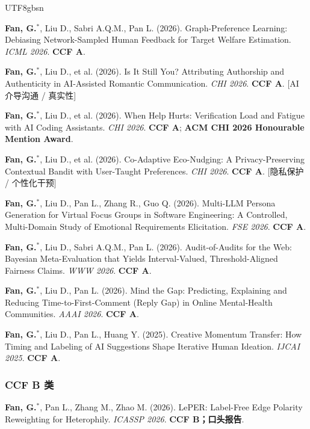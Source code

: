 \documentclass[a4paper,10pt]{article}
\newcommand{\papertag}[1]{\textcolor{cvgray}{\footnotesize\textsf{[#1]}}}
\newcommand{\pubitem}[1]{\item #1}
\begin{document}
\begin{CJK*}{UTF8}{gbsn}
\begin{enumerate}[label=\textbf{[C\arabic*]}]
  \pubitem{\textbf{Fan, G.}$^{*}$, Liu D., Sabri A.Q.M., Pan L. (2026). Graph-Preference Learning: Debiasing Network-Sampled Human Feedback for Target Welfare Estimation. \textit{ICML 2026}. \textbf{CCF A}. }

  \pubitem{\textbf{Fan, G.}$^{*}$, Liu D., et al. (2026). Is It Still You? Attributing Authorship and Authenticity in AI-Assisted Romantic Communication. \textit{CHI 2026}. \textbf{CCF A}. \papertag{AI 介导沟通 / 真实性}}

  \pubitem{\textbf{Fan, G.}$^{*}$, Liu D., et al. (2026). When Help Hurts: Verification Load and Fatigue with AI Coding Assistants. \textit{CHI 2026}. \textbf{CCF A}; \textbf{ACM CHI 2026 Honourable Mention Award}. }

  \pubitem{\textbf{Fan, G.}$^{*}$, Liu D., et al. (2026). Co-Adaptive Eco-Nudging: A Privacy-Preserving Contextual Bandit with User-Taught Preferences. \textit{CHI 2026}. \textbf{CCF A}. \papertag{隐私保护 / 个性化干预}}

  \pubitem{\textbf{Fan, G.}$^{*}$, Liu D., Pan L., Zhang R., Guo Q. (2026). Multi-LLM Persona Generation for Virtual Focus Groups in Software Engineering: A Controlled, Multi-Domain Study of Emotional Requirements Elicitation. \textit{FSE 2026}. \textbf{CCF A}. }

  \pubitem{\textbf{Fan, G.}$^{*}$, Liu D., Sabri A.Q.M., Pan L. (2026). Audit-of-Audits for the Web: Bayesian Meta-Evaluation that Yields Interval-Valued, Threshold-Aligned Fairness Claims. \textit{WWW 2026}. \textbf{CCF A}.}

  \pubitem{\textbf{Fan, G.}$^{*}$, Liu D., Pan L. (2026). Mind the Gap: Predicting, Explaining and Reducing Time-to-First-Comment (Reply Gap) in Online Mental-Health Communities. \textit{AAAI 2026}. \textbf{CCF A}. }

  \pubitem{\textbf{Fan, G.}$^{*}$, Liu D., Pan L., Huang Y. (2025). Creative Momentum Transfer: How Timing and Labeling of AI Suggestions Shape Iterative Human Ideation. \textit{IJCAI 2025}. \textbf{CCF A}. }
\end{enumerate}

\subsubsection*{CCF B 类}
\begin{enumerate}[label=\textbf{[C\arabic*]},resume]
  \pubitem{\textbf{Fan, G.}$^{*}$, Pan L., Zhang M., Zhao M. (2026). LePER: Label-Free Edge Polarity Reweighting for Heterophily. \textit{ICASSP 2026}. \textbf{CCF B；口头报告}. }


\end{enumerate}
\end{CJK*}
\end{document}
